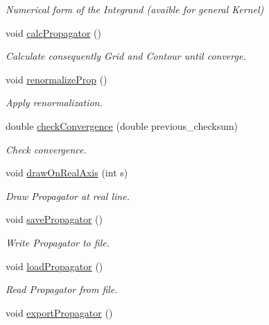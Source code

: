 \begin{DoxyCompactItemize}
\begin{DoxyCompactList}\small\item\em Numerical form of the Integrand (avaible for general Kernel) \end{DoxyCompactList}\item 
void \hyperlink{class_c___quark_a6e76c6b1d863858beed18f1c0d9e41d1}{calc\-Propagator} ()
\begin{DoxyCompactList}\small\item\em Calculate consequently Grid and Contour until converge. \end{DoxyCompactList}\item 
void \hyperlink{class_c___quark_a5dc9671be863cde85f57705caaf11ee6}{renormalize\-Prop} ()
\begin{DoxyCompactList}\small\item\em Apply renormalization. \end{DoxyCompactList}\item 
double \hyperlink{class_c___quark_ae755b4cd41dd4ce1a6dfd1c432d01bd1}{check\-Convergence} (double previous\-\_\-checksum)
\begin{DoxyCompactList}\small\item\em Check convergence. \end{DoxyCompactList}\item 
void \hyperlink{class_c___quark_af6aebddc61fe85aaf454e459d3de6283}{draw\-On\-Real\-Axis} (int s)
\begin{DoxyCompactList}\small\item\em Draw Propagator at real line. \end{DoxyCompactList}\item 
void \hyperlink{class_c___quark_a53d6cb2219f3a6deb67e6ba85aba8f92}{save\-Propagator} ()
\begin{DoxyCompactList}\small\item\em Write Propagator to file. \end{DoxyCompactList}\item 
void \hyperlink{class_c___quark_afff9ac6d9f21b6d3656c1a0e380f9327}{load\-Propagator} ()
\begin{DoxyCompactList}\small\item\em Read Propagator from file. \end{DoxyCompactList}\item 
void \hyperlink{class_c___quark_a998f5c9e3ee4920aae7f86e2b1e0c179}{export\-Propagator} ()
\end{DoxyCompactItemize}
